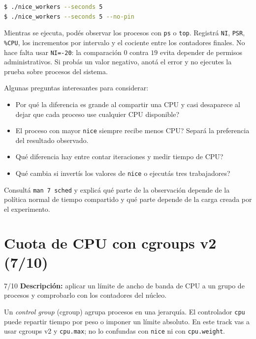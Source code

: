 \documentclass[11pt,a4paper]{article}
\begin{document}
\begin{lstlisting}[language=bash]
$ ./nice_workers --seconds 5
$ ./nice_workers --seconds 5 --no-pin
\end{lstlisting}

Mientras se ejecuta, podés observar los procesos con \texttt{ps} o
\texttt{top}. Registrá \texttt{NI}, \texttt{PSR}, \texttt{\%CPU}, los
incrementos por intervalo y el cociente entre los contadores finales. No hace
falta usar \texttt{NI=-20}: la comparación $0$ contra $19$ evita depender de
permisos administrativos. Si probás un valor negativo, anotá el error y no
ejecutes la prueba sobre procesos del sistema.

Algunas preguntas interesantes para considerar:

\begin{itemize}[leftmargin=*]
  \item Por qué la diferencia es grande al compartir una CPU y casi
  desaparece al dejar que cada proceso use cualquier CPU disponible?
  \item El proceso con mayor \texttt{nice} siempre recibe menos CPU? Separá
  la preferencia del resultado observado.
  \item Qué diferencia hay entre contar iteraciones y medir tiempo de CPU?
  \item Qué cambia si invertís los valores de \texttt{nice} o ejecutás tres
  trabajadores?
\end{itemize}

Consultá \texttt{man 7 sched} y explicá qué parte de la observación depende de
la política normal de tiempo compartido y qué parte depende de la carga creada
por el experimento.

\newpage
\section{Cuota de CPU con cgroups v2 (7/10)}

\begin{trackbox}{7/10}
\textbf{Descripción:} aplicar un límite de ancho de banda de CPU a un grupo de
procesos y comprobarlo con los contadores del núcleo.
\end{trackbox}

Un \emph{control group} (cgroup) agrupa procesos en una jerarquía. El
controlador \texttt{cpu} puede repartir tiempo por peso o imponer un límite
absoluto. En este track vas a usar cgroups v2 y \texttt{cpu.max}; no lo
confundas con \texttt{nice} ni con \texttt{cpu.weight}.
\end{document}
